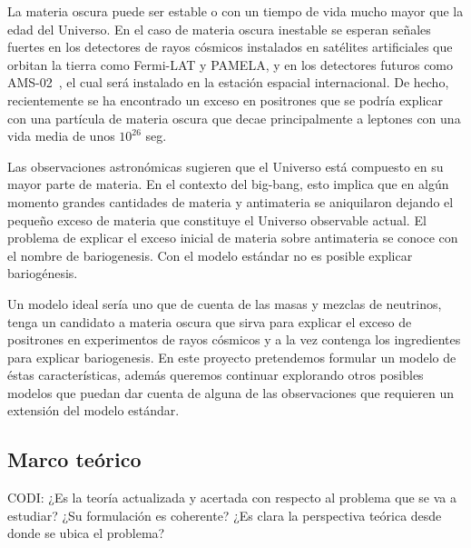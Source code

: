 La materia oscura puede ser estable o con un tiempo de vida mucho mayor que la edad del Universo. En el caso de materia oscura inestable se esperan señales fuertes en los detectores de rayos cósmicos instalados en satélites artificiales que orbitan la tierra como Fermi-LAT y PAMELA, y en los detectores futuros como AMS-02~\cite{ams:2009}, el cual será instalado en la estación espacial internacional.  De hecho, recientemente se ha encontrado un exceso en positrones que se podría explicar con una partícula de materia oscura que decae principalmente a leptones con una vida media de unos $10^{26}$ seg.

Las observaciones astronómicas sugieren que el Universo está compuesto en su mayor parte de materia. En el contexto del big-bang, esto implica que en algún momento grandes cantidades de materia y antimateria se aniquilaron dejando el pequeño exceso de materia que constituye el Universo observable actual. El problema de explicar el exceso inicial de materia sobre antimateria se conoce con el nombre de bariogenesis. Con el modelo estándar no es posible explicar bariogénesis.  

Un modelo ideal sería uno que de cuenta de las masas y mezclas de neutrinos, tenga un candidato a materia oscura que sirva para explicar el exceso de positrones en experimentos de rayos cósmicos y a la vez contenga los ingredientes para explicar bariogenesis. En este proyecto pretendemos formular un modelo de éstas características, además queremos continuar explorando otros posibles modelos que puedan dar cuenta de alguna de las observaciones que requieren un extensión del modelo estándar.


 

\subsection{Marco teórico}

\begin{instrucciones}
 CODI: ¿Es la teoría actualizada y acertada con respecto al problema que se va a estudiar? ¿Su formulación es coherente? ¿Es clara la perspectiva teórica desde donde se ubica el problema?
\end{instrucciones}


